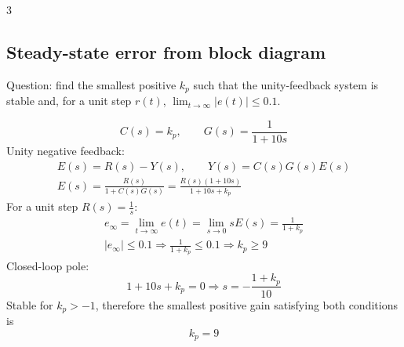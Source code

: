 \documentclass[9pt, landscape, a4paper]{article}
\begin{document}
\begin{multicols*}{3}
\subsection{Steady-state error from block diagram}
Question: find the smallest positive $k_p$ such that the unity-feedback system is
stable and, for a unit step $r(t)$, $\lim_{t\to\infty}|e(t)|\le 0.1$.
\begin{center}
\end{center}
\[
    C(s)=k_p,\qquad G(s)=\frac{1}{1+10s}
\]
Unity negative feedback:
\begin{gather*}
    E(s)=R(s)-Y(s),\qquad Y(s)=C(s)G(s)E(s)\\
    E(s)=\frac{R(s)}{1+C(s)G(s)}
    =\frac{R(s)(1+10s)}{1+10s+k_p}
\end{gather*}
For a unit step $R(s)=\frac{1}{s}$:
\begin{gather*}
    e_\infty=\lim_{t\to\infty}e(t)
    =\lim_{s\to0}sE(s)
    =\frac{1}{1+k_p}\\
    \left|e_\infty\right|\le 0.1
    \Rightarrow \frac{1}{1+k_p}\le 0.1
    \Rightarrow k_p\ge 9
\end{gather*}
Closed-loop pole:
\[
    1+10s+k_p=0 \Rightarrow s=-\frac{1+k_p}{10}
\]
Stable for $k_p>-1$, therefore the smallest positive gain satisfying both conditions is
\[
    \boxed{k_p=9}
\]


\end{multicols*}
\end{document}
